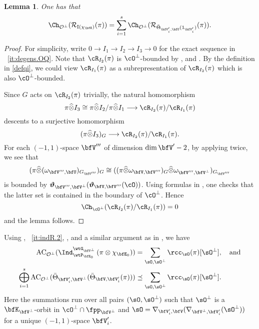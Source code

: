\documentclass[12pt,a4paper]{amsart}
\newcommand{\AC}{\mathrm{AC}}
\def\AC{\mathrm{AC}}
\newcommand{\CO}{{\mathcal {O}}}
\newcommand{\CR}{{\mathcal {R}}}
\newcommand{\RI}{{\mathrm {I}}}
\def\DD{\nabla}
\numberwithin{equation}{section}
\newtheorem{lem}[thm]{Lemma}
\theoremstyle{remark}
\def\abfV{\bfV'}
\def\Thetab{\bar{\Theta}}
\def\bfVpe{\bfV^\perp}
\def\totimes{\widehat{\otimes}}
\begin{document}
\begin{lem}\label{decomindq}
One has that
\[
  \Ch_{\CO^\perp}( \CR_{\RI(\chi_{\bfE})} (\pi))=\sum_{i=1}^s \Ch_{\CO^\perp}( \CR_{\Thetab_{\abfV_i,\bfU}(1_{\abfV_i})} (\pi)).
 \]
\end{lem}
\begin{proof}
For simplicity, write $0\rightarrow I_1\rightarrow I_2\rightarrow I_3\rightarrow
0$ for the exact sequence in ~\ref{it:degens.OQ}.
Note that $\cR_{I_2}(\pi)$ is $\cO^\perp$-bounded by ,
 and \cite[Theorem~1.4]{SV}.
By the definition in \cref{defqi}, we could view $\cR_{I_1}(\pi)$ as a
subrepresentation of  $ \cR_{I_2}(\pi)$ which is also $\cO^\perp$-bounded.

Since $G$ acts on $\cR_{I_2}(\pi)$ trivially, the natural homomorphism
\[
  \pi\totimes I_3\cong \pi\totimes I_2/\pi \totimes I_1\longrightarrow \cR_{I_2}(\pi)/\cR_{I_1}(\pi)\]
descents to a surjective homomorphism
\[
  (\pi\totimes  I_3)_{G}\longrightarrow \cR_{I_2}(\pi)/\cR_{I_1}(\pi).
\]
For each $(-1,1)$-space $\bfV'''$ of dimension $\dim
\abfV-2$, by applying  twice,
we see that
\[
(\pi\totimes (\omega_{\bfV''',\bfU})_{ G_{\bfV'''}})_{G}\cong ((\pi\totimes \omega_{\bfV,\bfV'''})_G\totimes \omega_{\bfV''',\bfVpe})_{ G_{\bfV'''}}
\]
 is
bounded by
$\oliftc_{\bfV''', \bfVpe}(\oliftc_{\bfV,\bfV'''}(\cO))$. Using formulas in  \cite[Theorem~5.2 and 5.6]{DKPC}, one checks that the latter set is contained in the boundary of  $\cO^\perp
$. Hence
\[
\Ch_{\cO^\perp}(\cR_{I_2}(\pi)/\cR_{I_1}(\pi)) = 0
\] and the lemma follows.
\end{proof}

Using , ~\ref{it:indR.2}, \cite[Theorem~1.4]{SV},  and a
similar argument as in , we have
  \begin{align}
    \label{chopq1}
      \AC_{\CO^\perp}(\Ind_{\wtP_{\bfE_0}}^{\wtG_{\bfV^\perp}} \left(\pi\otimes
        \chi_{\bfE_0}\right)) &= \sum_{\sO, \sO^\perp} \rcc_\sO(\pi) [\sO^\perp ],
      \quad \text{and}\\
    \label{chopq2}
      \bigoplus_{i=1}^s \AC_{
        \CO^\perp}(\Thetab_{\abfV_i, \bfV^\perp}(\Thetab_{\bfV,\abfV_i}(\pi)))& \preceq
      \sum_{\sO, \sO^\perp} \rcc_\sO(\pi) [\sO^\perp ].
  \end{align}
  Here
  the summations run over all pairs $(\sO,\sO^\perp)$ such that $\sO^\perp$ is a
  $\bfK_{\bfVpe}$-orbit in  $\cO^\perp\cap \fpp_{\bfVpe}$ and $\sO =
  \DD_{\abfV_i,\bfV}(\DD_{\bfVpe,\abfV_i}(\sO^\perp))$ for a unique $(-1,1)$-space $\abfV_i$.
\end{document}
